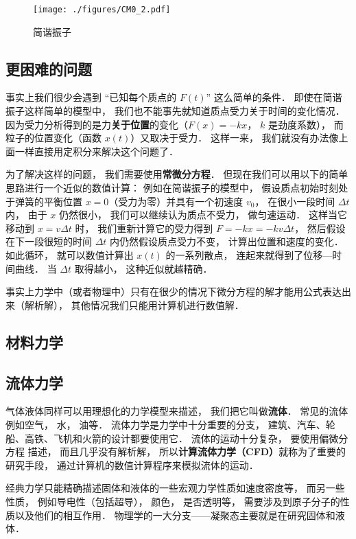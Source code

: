 \begin{figure}[ht]
\centering
\texttt{[image: ./figures/CM0\_2.pdf]}
\caption{简谐振子} \label{CM0_fig2}
\end{figure}

\subsection{更困难的问题}
事实上我们很少会遇到 “已知每个质点的 $F(t)$” 这么简单的条件． 即使在简谐振子这样简单的模型中， 我们也不能事先就知道质点受力关于时间的变化情况． 因为受力分析得到的是力\textbf{关于位置}的变化（$F(x) = -k x$， $k$ 是劲度系数）， 而粒子的位置变化（函数 $x(t)$）又取决于受力． 这样一来， 我们就没有办法像上面一样直接用定积分来解决这个问题了．

为了解决这样的问题， 我们需要使用\textbf{常微分方程}． 但现在我们可以用以下的简单思路进行一个近似的数值计算： 例如在简谐振子的模型中， 假设质点初始时刻处于弹簧的平衡位置 $x = 0$（受力为零）并具有一个初速度 $v_0$， 在很小一段时间 $\Delta t$ 内， 由于 $x$ 仍然很小， 我们可以继续认为质点不受力， 做匀速运动． 这样当它移动到 $x = v\Delta t$ 时， 我们重新计算它的受力得到 $F = -kx = -k v \Delta t$， 然后假设在下一段很短的时间 $\Delta t$ 内仍然假设质点受力不变， 计算出位置和速度的变化． 如此循环， 就可以数值计算出 $x(t)$ 的一系列散点， 连起来就得到了位移—时间曲线． 当 $\Delta t$ 取得越小， 这种近似就越精确．

事实上力学中（或者物理中）只有在很少的情况下微分方程的解才能用公式表达出来（解析解）， 其他情况我们只能用计算机进行数值解．

\subsection{材料力学}

\subsection{流体力学}
气体液体同样可以用理想化的力学模型来描述， 我们把它叫做\textbf{流体}． 常见的流体例如空气， 水， 油等． 流体力学是力学中十分重要的分支， 建筑、汽车、轮船、高铁、飞机和火箭的设计都要使用它． 流体的运动十分复杂， 要使用偏微分方程%
描述， 而且几乎没有解析解， 所以\textbf{计算流体力学（CFD）}就称为了重要的研究手段， 通过计算机的数值计算程序来模拟流体的运动．

经典力学只能精确描述固体和液体的一些宏观力学性质如速度密度等， 而另一些性质， 例如导电性（包括超导）， 颜色， 是否透明等， 需要涉及到原子分子的性质以及他们的相互作用． 物理学的一大分支——凝聚态主要就是在研究固体和液体．

